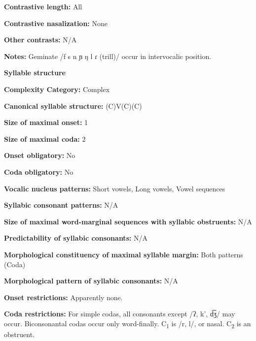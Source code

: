 \textbf{Contrastive length:} All



\textbf{Contrastive nasalization:} None



\textbf{Other contrasts:} N/A



\textbf{Notes:} Geminate /f s n ɲ ŋ l ɾ (trill)/ occur in intervocalic position.



\textbf{Syllable structure}



\textbf{Complexity Category:} Complex



\textbf{Canonical syllable structure:} (C)V(C)(C) \citep[36-43]{Stirtz2011}



\textbf{Size of maximal onset:} 1



\textbf{Size of maximal coda:} 2



\textbf{Onset obligatory:} No



\textbf{Coda obligatory:} No



\textbf{Vocalic nucleus patterns:} Short vowels, Long vowels, Vowel sequences



\textbf{Syllabic consonant patterns:} N/A



\textbf{Size of maximal word{}-marginal sequences with syllabic obstruents:} N/A



\textbf{Predictability of syllabic consonants:} N/A



\textbf{Morphological constituency of maximal syllable margin:} Both patterns (Coda)



\textbf{Morphological pattern of syllabic consonants:} N/A



\textbf{Onset restrictions:} Apparently none.



\textbf{Coda restrictions:} For simple codas, all consonants except /ʔ, k’, d͡ʒ/ may occur. Biconsonantal codas occur only word-finally. C\textsubscript{1} is /r, l/, or nasal. C\textsubscript{2} is an obstruent.



